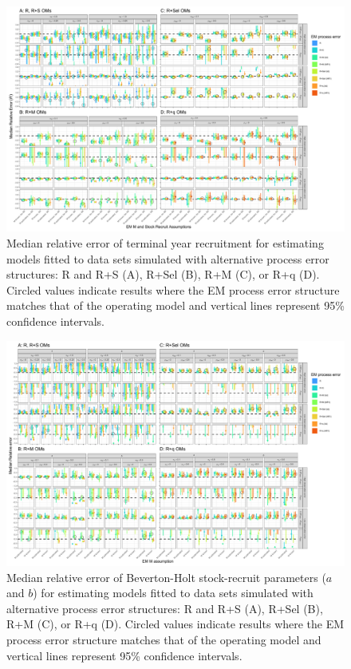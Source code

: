 \documentclass[
  12pt,
]{article}
\begin{document}
\begin{landscape}
\begin{figure}
\begin{center}
\includegraphics{term_R_bias_plots}
\end{center}
\caption{Median relative error of terminal year recruitment for estimating models fitted to data sets simulated with alternative process error structures: R and R+S (A), R+Sel (B), R+M (C), or R+q (D). Circled values indicate results where the EM process error structure matches that of the operating model and vertical lines represent 95\% confidence intervals.}\label{R_rel_error}
\end{figure}
\end{landscape}

\begin{landscape}
\begin{figure}
\begin{center}
\includegraphics{sr_bias_plots}
\end{center}
\caption{Median relative error of Beverton-Holt stock-recruit parameters ($a$ and $b$) for estimating models fitted to data sets simulated with alternative process error structures: R and R+S (A), R+Sel (B), R+M (C), or R+q (D). Circled values indicate results where the EM process error structure matches that of the operating model and vertical lines represent 95\% confidence intervals.}\label{SR_rel_error}
\end{figure}
\end{landscape}
\end{document}
